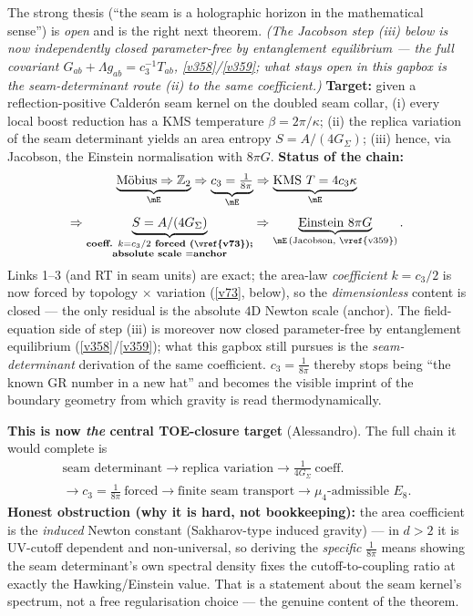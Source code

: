 \documentclass[11pt,a4paper]{article}
\newcommand{\cthree}{c_3}
\newcommand{\Z}{\mathbb Z}
\begin{document}
\begin{gapbox}
The strong thesis (``the seam is a holographic horizon in the mathematical sense'') is \emph{open} and is
the right next theorem. \emph{(The Jacobson step (iii) below is now independently closed parameter-free by
entanglement equilibrium --- the full covariant $G_{ab}{+}\Lambda g_{ab}{=}\cthree^{-1}T_{ab}$,
\vref{v358}/\vref{v359}; what stays open in \emph{this} gapbox is the \emph{seam-determinant} route (ii) to the
same coefficient.)} \textbf{Target:} given a reflection-positive Calder\'on seam kernel on the doubled
seam collar, (i) every local boost reduction has a KMS temperature $\beta=2\pi/\kappa$; (ii) the replica
variation of the seam determinant yields an area entropy $S=A/(4G_\Sigma)$; (iii) hence, via Jacobson, the
Einstein normalisation with $8\pi G$. \textbf{Status of the chain:}
\[
  \begin{gathered}
  \underbrace{\text{M\"obius}\Rightarrow\Z_2}_{\mE}\Rightarrow
  \underbrace{\cthree=\tfrac1{8\pi}}_{\mE}\Rightarrow
  \underbrace{\text{KMS }T=4\cthree\kappa}_{\mE}\\[3pt]
  \Rightarrow
  \underbrace{S=A/(4G_\Sigma)}_{\substack{\textbf{coeff. }k=\cthree/2\textbf{ forced (\vref{v73});}\\\textbf{absolute scale }=\textbf{anchor}}}\Rightarrow
  \underbrace{\text{Einstein }8\pi G}_{\mE\,(\text{Jacobson, \vref{v359}})}.
  \end{gathered}
\]
Links 1--3 (and RT in seam units) are exact; the area-law \emph{coefficient} $k=\cthree/2$ is now forced by
topology $\times$ variation (\vref{v73}, below), so the \emph{dimensionless} content is closed --- the only residual
is the absolute $4$D Newton scale (anchor). The field-equation side of step (iii) is moreover now closed
parameter-free by entanglement equilibrium (\vref{v358}/\vref{v359}); what this gapbox still pursues is the
\emph{seam-determinant} derivation of the same coefficient. $\cthree=\tfrac1{8\pi}$ thereby stops being ``the known GR number
in a new hat'' and becomes the visible imprint of the boundary geometry from which gravity is read
thermodynamically.

\smallskip\noindent\textbf{This is now \emph{the} central TOE-closure target} (Alessandro). The full chain it
would complete is
\[
  \begin{gathered}
  \text{seam determinant}\to\text{replica variation}\to\tfrac1{4G_\Sigma}\ \text{coeff.}\\[2pt]
  \to\cthree=\tfrac1{8\pi}\ \text{forced}\to\text{finite seam transport}\to\mu_4\text{-admissible }E_8.
  \end{gathered}
\]
\textbf{Honest obstruction (why it is hard, not bookkeeping):} the area coefficient is the \emph{induced}
Newton constant (Sakharov-type induced gravity) --- in $d>2$ it is UV-cutoff dependent and non-universal, so
deriving the \emph{specific} $\tfrac1{8\pi}$ means showing the seam determinant's own spectral density fixes
the cutoff-to-coupling ratio at exactly the Hawking/Einstein value. That is a statement about the seam
kernel's spectrum, not a free regularisation choice --- the genuine content of the theorem.


\end{gapbox}
\end{document}
